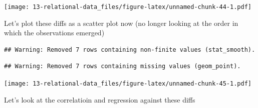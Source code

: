 \documentclass[]{book}
\newenvironment{Shaded}{\begin{snugshade}}{\end{snugshade}}
\newcommand{\DataTypeTok}[1]{\textcolor[rgb]{0.13,0.29,0.53}{#1}}
\newcommand{\KeywordTok}[1]{\textcolor[rgb]{0.13,0.29,0.53}{\textbf{#1}}}
\newcommand{\NormalTok}[1]{#1}
\newcommand{\OperatorTok}[1]{\textcolor[rgb]{0.81,0.36,0.00}{\textbf{#1}}}
\newcommand{\StringTok}[1]{\textcolor[rgb]{0.31,0.60,0.02}{#1}}
\theoremstyle{definition}
\theoremstyle{definition}
\theoremstyle{definition}
\theoremstyle{remark}
\begin{document}
\texttt{[image: 13-relational-data\_files/figure-latex/unnamed-chunk-44-1.pdf]}

Let's plot these diffs as a scatter plot now (no longer looking at the
order in which the observations emerged)

\begin{Shaded}
\end{Shaded}

\begin{verbatim}
## Warning: Removed 7 rows containing non-finite values (stat_smooth).
\end{verbatim}

\begin{verbatim}
## Warning: Removed 7 rows containing missing values (geom_point).
\end{verbatim}

\texttt{[image: 13-relational-data\_files/figure-latex/unnamed-chunk-45-1.pdf]}

Let's look at the correlatioin and regression against these diffs
\end{document}
